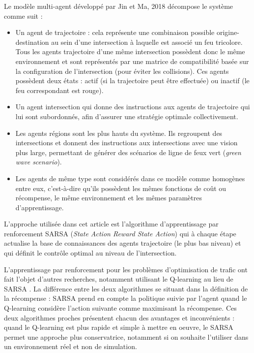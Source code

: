 \documentclass[11pt]{article}
\begin{document}
Le modèle multi-agent développé par Jin et Ma, 2018 \cite{JinMa17} décompose le système comme suit :

\begin{itemize}
\item Un agent de trajectoire : cela représente une combinaison possible origine-destination au sein d'une intersection à laquelle est associé un feu tricolore. Tous les agents trajectoire d'une même intersection possèdent donc le même environnement et sont représentés par une matrice de compatibilité basée sur la configuration de l'intersection (pour éviter les collisions). Ces agents possèdent deux états : actif (si la trajectoire peut être effectuée) ou inactif (le feu correspondant est rouge).
\item Un agent intersection qui donne des instructions aux agents de trajectoire qui lui sont subordonnés, afin d'assurer une stratégie optimale collectivement.
\item Les agents régions sont les plus hauts du système. Ils regroupent des intersections et donnent des instructions aux intersections avec une vision plus large, permettant de générer des scénarios de ligne de feux vert (\textit{green wave scenario}).
\item Les agents de même type sont considérés dans ce modèle comme homogènes entre eux, c'est-à-dire qu'ils possèdent les mêmes fonctions de coût ou récompense, le même environnement et les mêmes paramètres d'apprentissage.
\end{itemize}

L'approche utilisée dans cet article est l'algorithme d'apprentissage par renforcement SARSA (\textit{State Action Reward State Action}) qui à chaque étape actualise la base de connaissances des agents trajectoire (le plus bas niveau) et qui définit le contrôle optimal au niveau de l'intersection.

L'apprentissage par renforcement pour les problèmes d'optimisation de trafic ont fait l'objet d'autres recherches, notamment utilisant le Q-learning au lieu de SARSA \cite{tantway-abdulhai2012}. La différence entre les deux algorithmes se situant dans la définition de la récompense : SARSA prend en compte la politique suivie par l'agent quand le Q-learning considère l'action suivante comme maximisant la récompense. Ces deux algorithmes proches présentent chacun des avantages et inconvénients : quand le Q-learning est plus rapide et simple à mettre en oeuvre, le SARSA permet une approche plus conservatrice, notamment si on souhaite l'utiliser dans un environnement réel et non de simulation.
\end{document}

